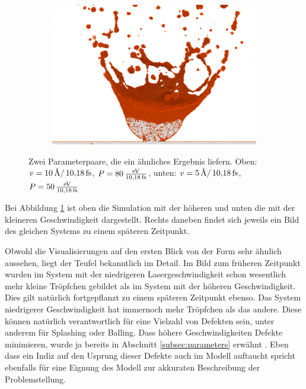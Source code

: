 \begin{figure}[!ht]
\begin{subfigure}{0.49\textwidth}
				\includegraphics[width=\textwidth]{chapter/main/single/img/power_calibration/v5_p50_t3000.png}
			\end{subfigure}
			\caption{Zwei Parameterpaare, die ein ähnliches Ergebnis liefern. Oben:
			$v = \SI{10}{\angstrom\per\timeunit}$, $P = \powerunit[80]$, unten:
			$v = \SI{5}{\angstrom\per\timeunit}$, $P = \powerunit[50]$}
			\label{fig:vel5_vel10}
		\end{figure}

		Bei Abbildung \ref{fig:vel5_vel10} ist oben die Simulation mit der höheren und unten die
		mit der kleineren Geschwindigkeit dargestellt. Rechts daneben findet sich jeweils ein Bild
		des gleichen Systems zu einem späteren Zeitpunkt.

		Obwohl die Visualisierungen auf den ersten Blick von der Form sehr ähnlich aussehen, liegt
		der Teufel bekanntlich im Detail. Im Bild zum früheren Zeitpunkt wurden im System mit der
		niedrigeren Lasergeschwindigkeit schon wesentlich mehr kleine Tröpfchen gebildet als im
		System mit der höheren Geschwindigkeit. Dies gilt natürlich fortgepflanzt zu einem
		späteren Zeitpunkt ebenso. Das System niedrigerer Geschwindigkeit hat immernoch mehr
		Tröpfchen als das andere. Diese können natürlich verantwortlich für eine Vielzahl von
		Defekten sein, unter anderem für Splashing oder Balling. Dass höhere Geschwindigkeiten
		Defekte minimieren, wurde ja bereits in Abschnitt \ref{subsec:parameters} erwähnt
		\cite{sadali2020influence}. Eben dass ein Indiz auf den Usprung dieser Defekte auch im
		Modell auftaucht spricht ebenfalls für eine Eignung des Modell zur akkuraten Beschreibung
		der Problemstellung.



